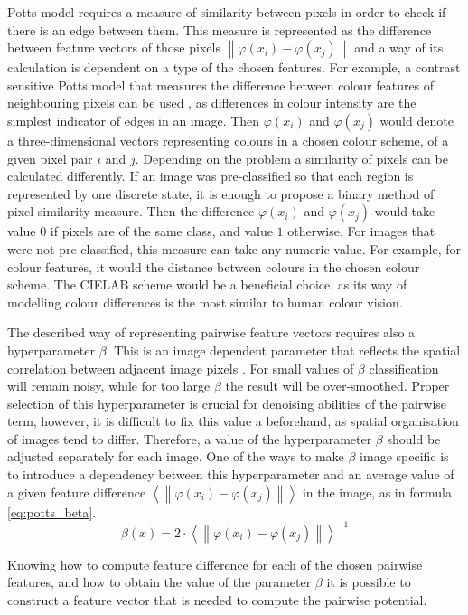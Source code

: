 Potts model requires a measure of similarity between pixels in order to check if there is an edge between them. This measure is represented as the difference between feature vectors of those pixels $\left \| \varphi(x_i) - \varphi(x_j)\right \|$ and a way of its calculation is dependent on a type of the chosen features. For example, a contrast sensitive Potts model that measures the difference between colour features of neighbouring pixels can be used \cite{article_main}, as differences in colour intensity are the simplest indicator of edges in an image. Then $\varphi(x_i)$ and $\varphi(x_j)$ would denote a three-dimensional vectors representing colours in a chosen colour scheme, of a given pixel pair $i$ and $j$. Depending on the problem a similarity of pixels can be calculated differently. If an image was pre-classified so that each region is represented by one discrete state, it is enough to propose a binary method of pixel similarity measure. Then the difference $\varphi(x_i)$ and $\varphi(x_j)$ would take value $0$ if pixels are of the same class, and value $1$ otherwise. For images that were not pre-classified, this measure can take any numeric value. For example, for colour features, it would the distance between colours in the chosen colour scheme. The CIELAB scheme would be a beneficial choice, as its way of modelling colour differences is the most similar to human colour vision. 

The described way of representing pairwise feature vectors requires also a hyperparameter $\beta$. This is an image dependent parameter that reflects the spatial correlation between adjacent image pixels \cite{potts_beta}. For small values of $\beta$ classification will remain noisy, while for too large $\beta$ the result will be over-smoothed. Proper selection of this hyperparameter is crucial for denoising abilities of the pairwise term, however, it is difficult to fix this value a beforehand, as spatial organisation of images tend to differ. Therefore, a value of the hyperparameter $\beta$ should be adjusted separately for each image. One of the ways to make $\beta$ image specific is to introduce a dependency between this hyperparameter and an average value of a given feature difference $\left \langle \left \| \varphi(x_i) - \varphi(x_j)\right \| \right \rangle$ in the image, as in formula \ref{eq:potts_beta}.
\begin{equation}
    \label{eq:potts_beta}
    \beta(x) = {2 \cdot {\left \langle \left \| \varphi(x_i) - \varphi(x_j)\right \| \right \rangle}} ^ {-1}
\end{equation}

Knowing how to compute feature difference for each of the chosen pairwise features, and how to obtain the value of the parameter $\beta$ it is possible to construct a feature vector that is needed to compute the pairwise potential. 